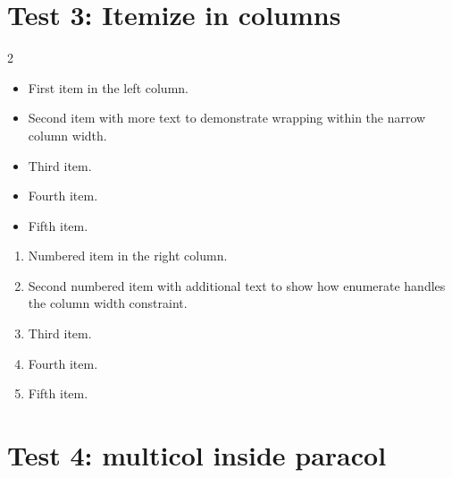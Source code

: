 \section{Test 3: Itemize in columns}

\begin{paracol}{2}

\begin{itemize}
  \item First item in the left column.
  \item Second item with more text to demonstrate wrapping
    within the narrow column width.
  \item Third item. \lipsum[1][1-2]
  \item Fourth item.
  \item Fifth item.
\end{itemize}

\switchcolumn

\begin{enumerate}
  \item Numbered item in the right column.
  \item Second numbered item with additional text to show
    how enumerate handles the column width constraint.
  \item Third item. \lipsum[2][1-2]
  \item Fourth item.
  \item Fifth item.
\end{enumerate}

\end{paracol}

%
\section{Test 4: multicol inside paracol}

